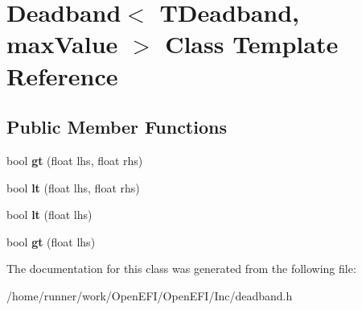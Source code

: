 \hypertarget{classDeadband}{}\section{Deadband$<$ T\+Deadband, max\+Value $>$ Class Template Reference}
\label{classDeadband}
\subsection*{Public Member Functions}
\begin{DoxyCompactItemize}
\item 
\mbox{\label{classDeadband_a3aa13788fc63c9414283588ccffb3162}} 
bool {\bfseries gt} (float lhs, float rhs)
\item 
\mbox{\label{classDeadband_a2e2cc43c425520dc47b37e66da8fae33}} 
bool {\bfseries lt} (float lhs, float rhs)
\item 
\mbox{\label{classDeadband_a9c0d1f50a9db275e4292b274781c9dc2}} 
bool {\bfseries lt} (float lhs)
\item 
\mbox{\label{classDeadband_abb49c2dda1c8aee0b05bb5dc2efc28fa}} 
bool {\bfseries gt} (float lhs)
\end{DoxyCompactItemize}


The documentation for this class was generated from the following file\+:\begin{DoxyCompactItemize}
\item 
/home/runner/work/\+Open\+E\+F\+I/\+Open\+E\+F\+I/\+Inc/deadband.\+h\end{DoxyCompactItemize}
